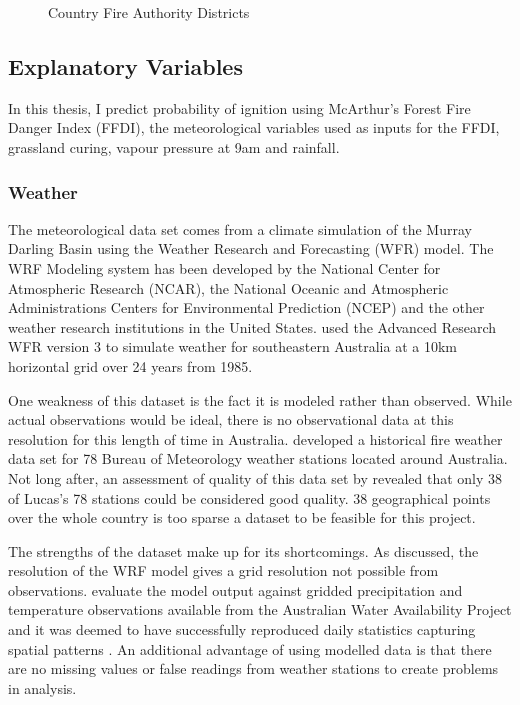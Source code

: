 \documentclass[11pt,a4paper]{article}
\begin{document}
\begin{figure}[!ht]
	\centering 
	\caption{Country Fire Authority Districts} 
	\label{fig:dist} 
\end{figure}

\subsection{Explanatory Variables}

In this thesis, I predict probability of ignition using McArthur's Forest Fire Danger Index (FFDI), the meteorological variables used as inputs for the FFDI, grassland curing, vapour pressure at 9am and rainfall.  

\subsubsection{Weather}

The meteorological data set comes from a climate simulation of the Murray Darling Basin using the Weather Research and Forecasting (WFR) model. The WRF Modeling system has been developed by the National Center for Atmospheric Research (NCAR), the National Oceanic and Atmospheric Administrations Centers for Environmental Prediction (NCEP) and the other weather research institutions in the United States. \citet{evans10} used the Advanced Research WFR version 3 \citep{skamarock08} to simulate weather for southeastern Australia at a 10km horizontal grid over 24 years from 1985.

One weakness of this dataset is the fact it is modeled rather than observed. While actual observations would be ideal, there is no observational data at this resolution for this length of time in Australia. \citet{lucas10} developed a historical fire weather data set for 78 Bureau of Meteorology weather stations located around Australia. Not long after, an assessment of quality of this data set by \citet{clarke2013} revealed that only 38 of Lucas's 78 stations could be considered good quality. 38 geographical points over the whole country is too sparse a dataset to be feasible for this project. 

The strengths of the dataset make up for its shortcomings. As discussed, the resolution of the WRF model gives a grid resolution not possible from observations. \citet{evans10} evaluate the model output against gridded precipitation and temperature observations available from the Australian Water Availability Project and it was deemed to have successfully reproduced daily statistics capturing spatial patterns  \citep{evans10, clarkeevans13}. An additional advantage of using modelled data is that there are no missing values or false readings from weather stations to create problems in analysis. 
\end{document}
